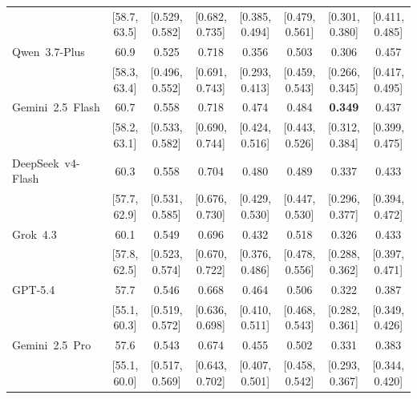 \documentclass[../main.tex]{subfiles}
\begin{document}
\begin{table}
\begin{tabular}{lccccccc}
                   & \footnotesize[58.7, 63.5] & \footnotesize[0.529, 0.582] & \footnotesize[0.682, 0.735] & \footnotesize[0.385, 0.494] & \footnotesize[0.479, 0.561] & \footnotesize[0.301, 0.380] & \footnotesize[0.411, 0.485] \\
\addlinespace[3pt]
Qwen~3.7-Plus      & 60.9            & 0.525           & 0.718           & 0.356           & 0.503           & 0.306           & 0.457           \\
                   & \footnotesize[58.3, 63.4] & \footnotesize[0.496, 0.552] & \footnotesize[0.691, 0.743] & \footnotesize[0.293, 0.413] & \footnotesize[0.459, 0.543] & \footnotesize[0.266, 0.345] & \footnotesize[0.417, 0.495] \\
\addlinespace[3pt]
Gemini~2.5~Flash   & 60.7            & 0.558           & 0.718           & 0.474           & 0.484           & \textbf{0.349}  & 0.437           \\
                   & \footnotesize[58.2, 63.1] & \footnotesize[0.533, 0.582] & \footnotesize[0.690, 0.744] & \footnotesize[0.424, 0.516] & \footnotesize[0.443, 0.526] & \footnotesize[0.312, 0.384] & \footnotesize[0.399, 0.475] \\
\addlinespace[3pt]
DeepSeek~v4-Flash  & 60.3            & 0.558           & 0.704           & 0.480           & 0.489           & 0.337           & 0.433           \\
                   & \footnotesize[57.7, 62.9] & \footnotesize[0.531, 0.585] & \footnotesize[0.676, 0.730] & \footnotesize[0.429, 0.530] & \footnotesize[0.447, 0.530] & \footnotesize[0.296, 0.377] & \footnotesize[0.394, 0.472] \\
\addlinespace[3pt]
Grok~4.3           & 60.1            & 0.549           & 0.696           & 0.432           & 0.518           & 0.326           & 0.433           \\
                   & \footnotesize[57.8, 62.5] & \footnotesize[0.523, 0.574] & \footnotesize[0.670, 0.722] & \footnotesize[0.376, 0.486] & \footnotesize[0.478, 0.556] & \footnotesize[0.288, 0.362] & \footnotesize[0.397, 0.471] \\
\addlinespace[3pt]
GPT-5.4            & 57.7            & 0.546           & 0.668           & 0.464           & 0.506           & 0.322           & 0.387           \\
                   & \footnotesize[55.1, 60.3] & \footnotesize[0.519, 0.572] & \footnotesize[0.636, 0.698] & \footnotesize[0.410, 0.511] & \footnotesize[0.468, 0.543] & \footnotesize[0.282, 0.361] & \footnotesize[0.349, 0.426] \\
\addlinespace[3pt]
Gemini~2.5~Pro     & 57.6            & 0.543           & 0.674           & 0.455           & 0.502           & 0.331           & 0.383           \\
                   & \footnotesize[55.1, 60.0] & \footnotesize[0.517, 0.569] & \footnotesize[0.643, 0.702] & \footnotesize[0.407, 0.501] & \footnotesize[0.458, 0.542] & \footnotesize[0.293, 0.367] & \footnotesize[0.344, 0.420] \\
\bottomrule
\end{tabular}
\end{table}
\end{document}
